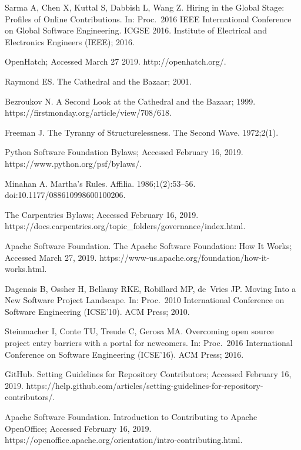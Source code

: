 \documentclass[10pt,letterpaper]{article}
\begin{document}
\begin{thebibliography}{10}
Sarma A, Chen X, Kuttal S, Dabbish L, Wang Z.
\newblock Hiring in the Global Stage: Profiles of Online Contributions.
\newblock In: Proc.\ 2016 {IEEE} International Conference on Global Software
  Engineering. ICGSE 2016. Institute of Electrical and Electronics Engineers
  ({IEEE}); 2016.

OpenHatch; Accessed March 27 2019.
\newblock http://openhatch.org/.

Raymond ES. The Cathedral and the Bazaar; 2001.

Bezroukov N. A Second Look at the Cathedral and the Bazaar; 1999.
\newblock https://firstmonday.org/article/view/708/618.

Freeman J.
\newblock The Tyranny of Structurelessness.
\newblock The Second Wave. 1972;2(1).

Python Software Foundation Bylaws; Accessed February 16, 2019.
\newblock https://www.python.org/psf/bylaws/.

Minahan A.
\newblock Martha's Rules.
\newblock Affilia. 1986;1(2):53--56.
\newblock doi:{10.1177/088610998600100206}.

The Carpentries Bylaws; Accessed February 16, 2019.
\newblock https://docs.carpentries.org/topic\_folders/governance/index.html.

{Apache Software Foundation}. The Apache Software Foundation: How It Works;
  Accessed March 27, 2019.
\newblock https://www-us.apache.org/foundation/how-it-works.html.

Dagenais B, Ossher H, Bellamy RKE, Robillard MP, de~Vries JP.
\newblock Moving Into a New Software Project Landscape.
\newblock In: Proc.\ 2010 International Conference on Software Engineering
  ({ICSE'10}). {ACM} Press; 2010.

Steinmacher I, Conte TU, Treude C, Gerosa MA.
\newblock Overcoming open source project entry barriers with a portal for
  newcomers.
\newblock In: Proc.\ 2016 International Conference on Software Engineering
  ({ICSE'16}). {ACM} Press; 2016.

GitHub. Setting Guidelines for Repository Contributors; Accessed February 16,
  2019.
\newblock https://help.github.com/articles/setting-guidelines-for-repository-
  contributors/.

{Apache Software Foundation}. Introduction to Contributing to Apache
  OpenOffice; Accessed February 16, 2019.
\newblock https://openoffice.apache.org/orientation/intro-contributing.html.


\end{thebibliography}
\end{document}
